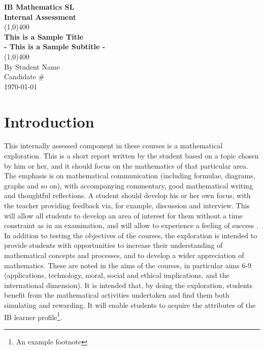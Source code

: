 \documentclass[11pt]{article}
\begin{document}
\begin{titlepage}
\begin{center}
\vspace*{1cm}
\Large{\textbf{IB Mathematics SL}}\\
\Large{\textbf{Internal Assessment}}\\
\vfill
\line(1,0){400}\\[1mm]
\huge{\textbf{This is a Sample Title}}\\[3mm]
\Large{\textbf{- This is a Sample Subtitle -}}\\[1mm]
\line(1,0){400}\\
\vfill
By Student Name\\
Candidate \# \\
\today
\end{center}
\end{titlepage}

\tableofcontents
\thispagestyle{empty}
\clearpage

\setcounter{page}{1}

\section{Introduction}
This internally assessed component in these courses is a mathematical exploration. This is a short report written by the student based on a topic chosen by him or her, and it should focus on the mathematics of that particular area. The emphasis is on mathematical communication (including formulae, diagrams, graphs and so on), with accompanying commentary, good mathematical writing and thoughtful reflections. A student should develop his or her own focus, with the teacher providing feedback via, for example, discussion and interview. This will allow all students to develop an area of interest for them without a time constraint as in an examination, and will allow to experience a feeling of success \cite{DBHS1}.\\

In addition to testing the objectives of the courses, the exploration is intended to provide students with opportunities to increase their understanding of mathematical concepts and processes, and to develop a wider appreciation of mathematics. These are noted in the aims of the courses, in particular aims 6-9 (applications, technology, moral, social and ethical implications, and the international dimension). It is intended that, by doing the exploration, students benefit from the mathematical activities undertaken and find them both simulating and rewarding. It will enable students to acquire the attributes of the IB learner profile\footnote{An example footnote}.
\end{document}
